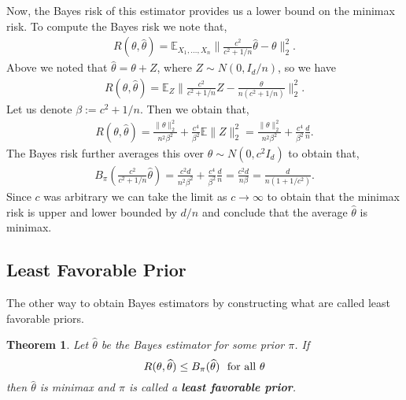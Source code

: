 \documentclass[twoside,12pt]{article}
\newcounter{lecnum}
\newtheorem{theorem}{Theorem}[lecnum]
\begin{document}
Now, the Bayes risk of this estimator provides us a lower bound on the minimax risk. To compute the Bayes risk we note that,
\begin{align*}
R(\theta,\widehat{\theta}) = \mathbb{E}_{X_1,\ldots,X_n} \| \frac{c^2}{c^2 + 1/n} \widehat{\theta} - \theta\|_2^2.
\end{align*}
Above we noted that $\widehat{\theta} = \theta + Z$, where $Z \sim N(0,I_d/n)$, so we have
\begin{align*}
R(\theta,\widehat{\theta}) =  \mathbb{E}_{Z} \| \frac{c^2}{c^2 + 1/n} Z - \frac{\theta}{n(c^2 + 1/n)}\|_2^2.
\end{align*}
Let us denote $\beta := c^2 +1/n$. Then we obtain that,
\begin{align*}
R(\theta,\widehat{\theta})  = \frac{\|\theta\|_2^2}{n^2\beta^2} + \frac{c^4}{\beta^2} \mathbb{E} \|Z\|_2^2 =  \frac{\|\theta\|_2^2}{n^2\beta^2} + \frac{c^4}{\beta^2} \frac{d}{n}.
\end{align*}
The Bayes risk further averages this over $\theta \sim N(0, c^2 I_d)$ to obtain that,
\begin{align*}
B_{\pi} ( \frac{c^2}{c^2 + 1/n} \widehat{\theta}) = \frac{c^2d}{n^2\beta^2} + \frac{c^4}{\beta^2} \frac{d}{n} = \frac{c^2 d}{n \beta} = \frac{d}{n (1 + 1/c^2)}.
\end{align*}
Since $c$ was arbitrary we can take the limit as $c \rightarrow \infty$ to obtain that the minimax risk is upper and lower bounded by $d/n$ and conclude that the average $\widehat{\theta}$ is minimax.

\subsection{Least Favorable Prior}
The other way to obtain Bayes estimators by constructing what are called least favorable priors. 

\begin{theorem}\label{thm::first-minimax}
Let $\widehat\theta$ be the Bayes estimator for some prior $\pi$.
If
\begin{equation}\label{eq:cond}
R(\theta,\widehat\theta)\leq B_\pi(\widehat\theta)\ \ {\rm for\ all\ }\theta
\end{equation}
then $\widehat\theta$ is minimax and $\pi$ is called a 
{\bf least favorable prior}.
\end{theorem}
\end{document}
